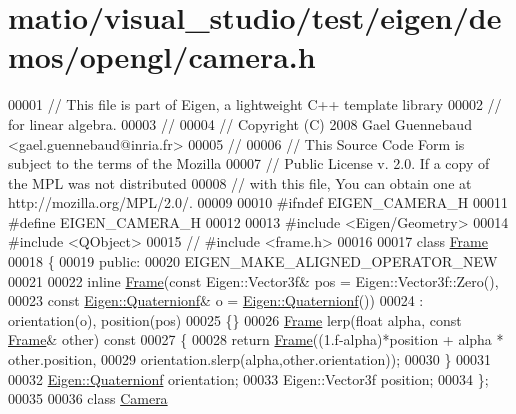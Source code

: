 \hypertarget{matio_2visual__studio_2test_2eigen_2demos_2opengl_2camera_8h_source}{}\section{matio/visual\+\_\+studio/test/eigen/demos/opengl/camera.h}
\label{matio_2visual__studio_2test_2eigen_2demos_2opengl_2camera_8h_source}

\begin{DoxyCode}
00001 \textcolor{comment}{// This file is part of Eigen, a lightweight C++ template library}
00002 \textcolor{comment}{// for linear algebra.}
00003 \textcolor{comment}{//}
00004 \textcolor{comment}{// Copyright (C) 2008 Gael Guennebaud <gael.guennebaud@inria.fr>}
00005 \textcolor{comment}{//}
00006 \textcolor{comment}{// This Source Code Form is subject to the terms of the Mozilla}
00007 \textcolor{comment}{// Public License v. 2.0. If a copy of the MPL was not distributed}
00008 \textcolor{comment}{// with this file, You can obtain one at http://mozilla.org/MPL/2.0/.}
00009 
00010 \textcolor{preprocessor}{#ifndef EIGEN\_CAMERA\_H}
00011 \textcolor{preprocessor}{#define EIGEN\_CAMERA\_H}
00012 
00013 \textcolor{preprocessor}{#include <Eigen/Geometry>}
00014 \textcolor{preprocessor}{#include <QObject>}
00015 \textcolor{comment}{// #include <frame.h>}
00016 
00017 \textcolor{keyword}{class }\hyperlink{class_frame}{Frame}
00018 \{
00019   \textcolor{keyword}{public}:
00020     EIGEN\_MAKE\_ALIGNED\_OPERATOR\_NEW
00021     
00022     \textcolor{keyword}{inline} \hyperlink{class_frame}{Frame}(\textcolor{keyword}{const} Eigen::Vector3f& pos = Eigen::Vector3f::Zero(),
00023                  \textcolor{keyword}{const} \hyperlink{group___geometry___module_class_eigen_1_1_quaternion}{Eigen::Quaternionf}& o = 
      \hyperlink{group___geometry___module_class_eigen_1_1_quaternion}{Eigen::Quaternionf}())
00024       : orientation(o), position(pos)
00025     \{\}
00026     \hyperlink{class_frame}{Frame} lerp(\textcolor{keywordtype}{float} alpha, \textcolor{keyword}{const} \hyperlink{class_frame}{Frame}& other)\textcolor{keyword}{ const}
00027 \textcolor{keyword}{    }\{
00028       \textcolor{keywordflow}{return} \hyperlink{class_frame}{Frame}((1.f-alpha)*position + alpha * other.position,
00029                    orientation.slerp(alpha,other.orientation));
00030     \}
00031 
00032     \hyperlink{group___geometry___module_class_eigen_1_1_quaternion}{Eigen::Quaternionf} orientation;
00033     Eigen::Vector3f position;
00034 \};
00035 
00036 \textcolor{keyword}{class }\hyperlink{class_camera}{Camera}

\end{DoxyCode}
